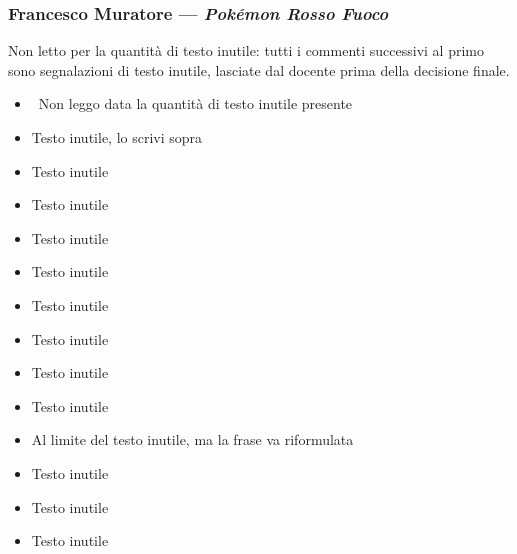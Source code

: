 \subsubsection{Francesco Muratore --- \emph{Pokémon Rosso Fuoco}}
Non letto per la quantità di testo inutile: tutti i commenti successivi al
primo sono segnalazioni di testo inutile, lasciate dal docente prima della
decisione finale.
{\small
\begin{itemize}
  \item {} \rvAvviso\ Non leggo data la quantità di testo inutile presente
  \item {} Testo inutile, lo scrivi sopra
  \item {} Testo inutile
  \item {} Testo inutile
  \item {} Testo inutile
  \item {} Testo inutile
  \item {} Testo inutile
  \item {} Testo inutile
  \item {} Testo inutile
  \item {} Testo inutile
  \item {} Al limite del testo inutile, ma la frase va riformulata
  \item {} Testo inutile
  \item {} Testo inutile
  \item {} Testo inutile
\end{itemize}
}

